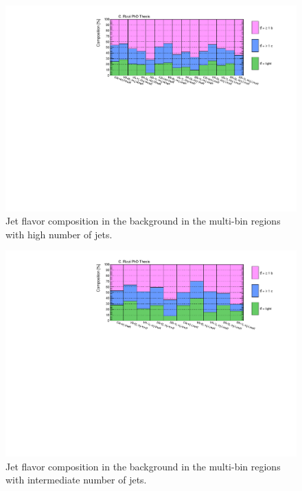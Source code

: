 \begin{figure}[htbp]
\includegraphics[width=\textwidth]{figures/Chap8/Rizzi-Fig8-26.pdf}
\caption{Jet flavor composition in the \ttbar background in the multi-bin regions with high number of jets.}
	\label{fig:HFcomp_Hnj}
\end{figure}

\begin{figure}[htbp]
\includegraphics[width=\textwidth]{figures/Chap8/Rizzi-Fig8-27.pdf}
\caption{Jet flavor composition in the \ttbar background in the multi-bin regions with intermediate number of jets.}
	\label{fig:HFcomp_Inj}
\end{figure}

